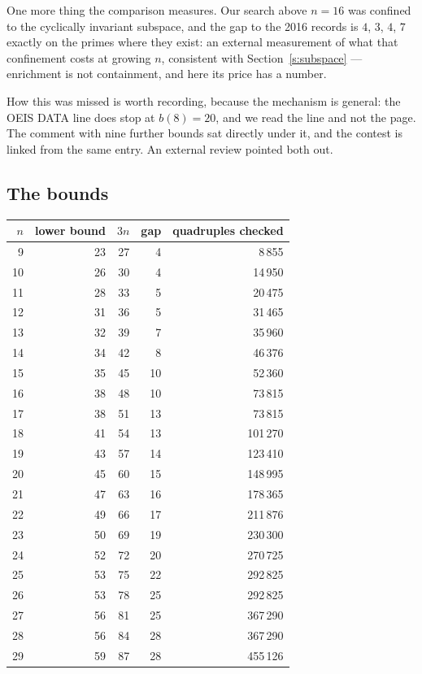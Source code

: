 \documentclass[11pt,a4paper]{article}
\begin{document}
One more thing the comparison measures.  Our search above $n=16$ was confined to the cyclically
invariant subspace, and the gap to the 2016 records is $4$, $3$, $4$, $7$ exactly on the primes where
they exist: an external measurement of what that confinement costs at growing $n$, consistent with
Section~\ref{s:subspace} --- enrichment is not containment, and here its price has a number.

How this was missed is worth recording, because the mechanism is general: the OEIS DATA line
does stop at $b(8)=20$, and we read the line and not the page.  The comment with nine further
bounds sat directly under it, and the contest is linked from the same entry.  An external
review pointed both out.

\subsection{The bounds}\label{s:bounds4}
\begin{center}
\begin{tabular}{rrrrr}
\toprule
$n$ & lower bound & $3n$ & gap & quadruples checked \\
\midrule
9 & 23 & 27 & 4 & 8\,855 \\
10 & 26 & 30 & 4 & 14\,950 \\
11 & 28 & 33 & 5 & 20\,475 \\
12 & 31 & 36 & 5 & 31\,465 \\
13 & 32 & 39 & 7 & 35\,960 \\
14 & 34 & 42 & 8 & 46\,376 \\
15 & 35 & 45 & 10 & 52\,360 \\
16 & 38 & 48 & 10 & 73\,815 \\
17 & 38 & 51 & 13 & 73\,815 \\
18 & 41 & 54 & 13 & 101\,270 \\
19 & 43 & 57 & 14 & 123\,410 \\
20 & 45 & 60 & 15 & 148\,995 \\
21 & 47 & 63 & 16 & 178\,365 \\
22 & 49 & 66 & 17 & 211\,876 \\
23 & 50 & 69 & 19 & 230\,300 \\
24 & 52 & 72 & 20 & 270\,725 \\
25 & 53 & 75 & 22 & 292\,825 \\
26 & 53 & 78 & 25 & 292\,825 \\
27 & 56 & 81 & 25 & 367\,290 \\
28 & 56 & 84 & 28 & 367\,290 \\
29 & 59 & 87 & 28 & 455\,126 \\
\bottomrule
\end{tabular}
\end{center}
\end{document}
